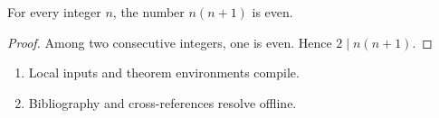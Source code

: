\begin{theorem}\label{thm:sample}
For every integer $n$, the number $n(n+1)$ is even.
\end{theorem}
\begin{proof}
Among two consecutive integers, one is even. Hence $2\mid n(n+1)$.
\end{proof}
\begin{enumerate}[label=(\roman*)]
\item Local inputs and theorem environments compile.
\item Bibliography and cross-references resolve offline.
\end{enumerate}
